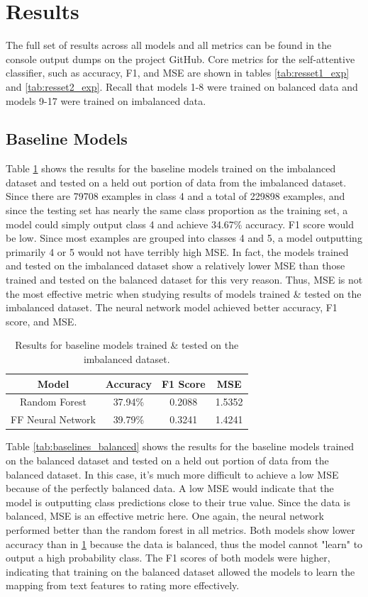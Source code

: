 \section{Results}
The full set of results across all models and all metrics can be found in the console output dumps on the project GitHub. Core metrics for the self-attentive classifier, such as accuracy, F1, and MSE are shown in tables \ref{tab:resset1_exp} and \ref{tab:resset2_exp}. Recall that models 1-8 were trained on balanced data and models 9-17 were trained on imbalanced data. 
\subsection{Baseline Models}
Table \ref{tab:baselines_imbalanced} shows the results for the baseline models trained on the imbalanced dataset and tested on a held out portion of data from the imbalanced dataset. Since there are 79708 examples in class 4 and a total of 229898 examples, and since the testing set has nearly the same class proportion as the training set, a model could simply output class 4 and achieve 34.67\% accuracy. F1 score would be low. Since most examples are grouped into classes 4 and 5, a model outputting primarily 4 or 5 would not have terribly high MSE. In fact, the models trained and tested on the imbalanced dataset show a relatively lower MSE than those trained and tested on the balanced dataset for this very reason. Thus, MSE is not the most effective metric when studying results of models trained \& tested on the imbalanced dataset. The neural network model achieved better accuracy, F1 score, and MSE. 

\begin{table}[H]
	\begin{tabular}{|c|c|c|c|}
		\hline
		\textbf{Model}    & \textbf{Accuracy} & \textbf{F1 Score} & \textbf{MSE} \\ \hline
		Random Forest     & 37.94\%           & 0.2088            & 1.5352       \\
		FF Neural Network & 39.79\%           & 0.3241            & 1.4241    \\ \hline
	\end{tabular}
	\caption{\label{tab:baselines_imbalanced} Results for baseline models trained \& tested on the imbalanced dataset.}
\end{table}
Table \ref{tab:baselines_balanced} shows the results for the baseline models trained on the balanced dataset and tested on a held out portion of data from the balanced dataset. In this case, it's much more difficult to achieve a low MSE because of the perfectly balanced data. A low MSE would indicate that the model is outputting class predictions close to their true value. Since the data is balanced, MSE is an effective metric here. One again, the neural network performed better than the random forest in all metrics. Both models show lower accuracy than in \ref{tab:baselines_imbalanced} because the data is balanced, thus the model cannot "learn" to output a high probability class. The F1 scores of both models were higher, indicating that training on the balanced dataset allowed the models to learn the mapping from text features to rating more effectively.


